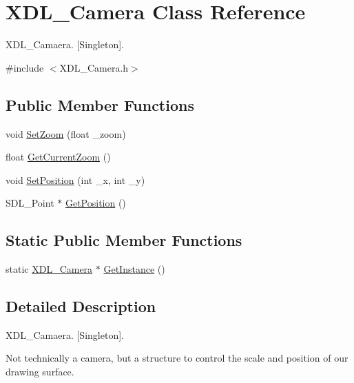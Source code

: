 \hypertarget{class_x_d_l___camera}{\section{X\-D\-L\-\_\-\-Camera Class Reference}
\label{class_x_d_l___camera}
}


X\-D\-L\-\_\-\-Camaera. \mbox{[}Singleton\mbox{]}.  




{\ttfamily \#include $<$X\-D\-L\-\_\-\-Camera.\-h$>$}

\subsection*{Public Member Functions}
\begin{DoxyCompactItemize}
\item 
void \hyperlink{class_x_d_l___camera_a4a973ddf2f7ab261f8bbaec4a911ba5e}{Set\-Zoom} (float \-\_\-zoom)
\item 
float \hyperlink{class_x_d_l___camera_afb54ec9b1efa5cf23faea192a63d8d44}{Get\-Current\-Zoom} ()
\item 
void \hyperlink{class_x_d_l___camera_a95e3e2c8dbbcaba8d9a6f572f1c0919d}{Set\-Position} (int \-\_\-x, int \-\_\-y)
\item 
S\-D\-L\-\_\-\-Point $\ast$ \hyperlink{class_x_d_l___camera_aaf2329b5bed3bdd0f679f3ce39d7aa89}{Get\-Position} ()
\end{DoxyCompactItemize}
\subsection*{Static Public Member Functions}
\begin{DoxyCompactItemize}
\item 
static \hyperlink{class_x_d_l___camera}{X\-D\-L\-\_\-\-Camera} $\ast$ \hyperlink{class_x_d_l___camera_af972e4ad4d82db12161f0b3c0234f279}{Get\-Instance} ()
\end{DoxyCompactItemize}


\subsection{Detailed Description}
X\-D\-L\-\_\-\-Camaera. \mbox{[}Singleton\mbox{]}. 

Not technically a camera, but a structure to control the scale and position of our drawing surface. 

